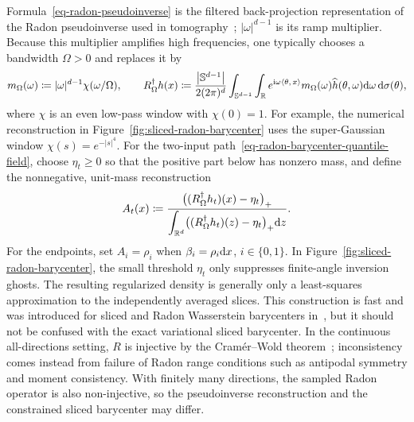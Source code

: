 Formula~\eqref{eq-radon-pseudoinverse} is the filtered back-projection representation of the Radon pseudoinverse used in tomography~\cite{HermanTomography}; $|\omega|^{d-1}$ is its ramp multiplier. Because this multiplier amplifies high frequencies, one typically chooses a bandwidth $\Omega>0$ and replaces it by
\begin{equation}\label{eq-radon-windowed-ramp}
	m_\Omega(\omega)
	\coloneqq
	|\omega|^{d-1}\chi(\omega/\Omega),
	\qquad
	R_\Omega^\dagger h(x)
	\coloneqq
	\frac{\left\lvert\mathbb{S}^{d-1}\right\rvert}{2(2\pi)^d}
	\int_{\mathbb{S}^{d-1}}\int_{\mathbb{R}}
	e^{\mathrm{i}\omega\langle \theta,\,x\rangle}
	m_\Omega(\omega)\widehat h(\theta,\omega)
	\mathrm{d}\omega\,\mathrm{d}\sigma(\theta),
\end{equation}
where $\chi$ is an even low-pass window with $\chi(0)=1$. For example, the numerical reconstruction in Figure~\ref{fig:sliced-radon-barycenter} uses the super-Gaussian window $\chi(s)=e^{-|s|^4}$. For the two-input path~\eqref{eq-radon-barycenter-quantile-field}, choose $\eta_t\geq0$ so that the positive part below has nonzero mass, and define the nonnegative, unit-mass reconstruction
\begin{equation}\label{eq-radon-display-reconstruction}
	A_t(x)
	\coloneqq
	\frac{\bigl((R_\Omega^\dagger h_t)(x)-\eta_t\bigr)_+}
	{\displaystyle\int_{\mathbb{R}^d}\bigl((R_\Omega^\dagger h_t)(z)-\eta_t\bigr)_+\mathrm{d} z}.
\end{equation}
For the endpoints, set $A_i=\rho_i$ when $\beta_i=\rho_i\mathrm{d} x$, $i\in\{0,1\}$. In Figure~\ref{fig:sliced-radon-barycenter}, the small threshold $\eta_t$ only suppresses finite-angle inversion ghosts. The resulting regularized density is generally only a least-squares approximation to the independently averaged slices. This construction is fast and was introduced for sliced and Radon Wasserstein barycenters in~\cite{2013-Bonneel-barycenter}, but it should not be confused with the exact variational sliced barycenter. In the continuous all-directions setting, $R$ is injective by the Cram\'er--Wold theorem~\cite{CramerWold1936}; inconsistency comes instead from failure of Radon range conditions such as antipodal symmetry and moment consistency. With finitely many directions, the sampled Radon operator is also non-injective, so the pseudoinverse reconstruction and the constrained sliced barycenter may differ.

